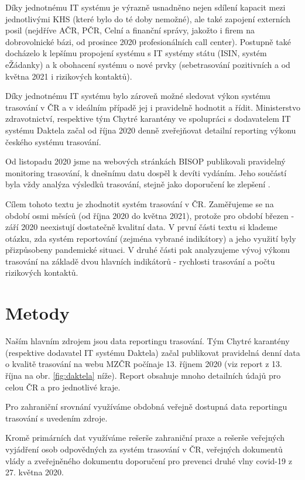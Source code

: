 Díky jednotnému IT systému je výrazně usnadněno nejen sdílení kapacit mezi jednotlivými KHS (které bylo do té doby nemožné), ale také zapojení externích posil (nejdříve AČR, PČR, Celní a finanční správy, jakožto i firem na dobrovolnické bázi, od prosince 2020 profesionálních call center). Postupně také docházelo k lepšímu propojení systému s IT systémy státu (ISIN, systém eŽádanky) a k obohacení systému o nové prvky (sebetrasování pozitivních a od května 2021 i rizikových kontaktů).

Díky jednotnému IT systému bylo zároveň možné sledovat výkon systému trasování v ČR a v ideálním případě jej i pravidelně hodnotit a řídit. Ministerstvo zdravotnictví, respektive tým Chytré karantény ve spolupráci s dodavatelem IT systému Daktela začal od října 2020 denně zveřejňovat detailní reporting výkonu českého systému trasování.

Od listopadu 2020 jsme na webových stránkách BISOP publikovali pravidelný monitoring trasování, k dnešnímu datu dospěl k devíti vydáním. Jeho součástí byla vždy analýza výsledků trasování, stejně jako doporučení ke zlepšení \cite{tr_bisop07}. 

Cílem tohoto textu je zhodnotit systém trasování v ČR. Zaměřujeme se na období osmi měsíců (od října 2020 do května 2021), protože pro období březen - září 2020 neexistují dostatečně kvalitní data. V první části textu si klademe otázku, zda systém reportování (zejména vybrané indikátory) a jeho využití byly přizpůsobeny pandemické situaci. V druhé části pak analyzujeme vývoj výkonu trasování na základě dvou hlavních indikátorů - rychlosti trasování a počtu rizikových kontaktů.

\section*{Metody}

Naším hlavním zdrojem jsou data reportingu trasování. Tým Chytré karantény (respektive dodavatel IT systému Daktela) začal publikovat pravidelná denní data o kvalitě trasování na webu MZČR počínaje 13. říjnem 2020 (viz report z 13. října na obr. \ref{fig:daktela} níže). Report obsahuje mnoho detailních údajů pro celou ČR a pro jednotlivé kraje.

Pro zahraniční srovnání využíváme obdobná veřejně dostupná data reportingu trasování s uvedením zdroje.

Kromě primárních dat využíváme rešerše zahraniční praxe a rešerše veřejných vyjádření osob odpovědných za systém trasování v ČR, veřejných dokumentů vlády a zveřejněného dokumentu doporučení pro prevenci druhé vlny covid-19 z 27. května 2020.

